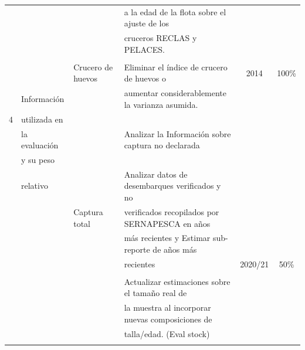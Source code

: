 \documentclass[
  spanish,
]{article}
\begin{document}
\begin{table}[h]
{\begin{tabular}{|c|l|l|l|c|c|}
     &               &                      & a la edad de la flota sobre el ajuste de los     &             & \\
     &               &                      & cruceros RECLAS y PELACES.                       &             & \\ 
     &               &                      &                                                  &             & \\
     &               & Crucero de huevos    & Eliminar el índice de crucero de huevos o        & 2014        & 100\%\\ 
     & Información   &                      & aumentar considerablemente la varianza asumida.  &             & \\ 
  4  & utilizada en  &                      &                                                  &             & \\
     & la evaluación &                      & Analizar la Información sobre captura no declarada&            & \\
     & y su peso     &                      &                                                   &            & \\
     & relativo      &                      & Analizar datos de desembarques verificados y no   &            & \\ 
     &               & Captura total        & verificados recopilados por SERNAPESCA en años    &            & \\ 
     &               &                      & más recientes y  Estimar sub-reporte de años más  &            & \\ 
     &               &                      & recientes                                         & 2020/21    & 50\%\\ 
     &               &                      &                                                   &            & \\
     &               &                      & Actualizar estimaciones sobre el tamaño real de   &            & \\ 
     &               &                      & la muestra al incorporar nuevas composiciones de  &            & \\ 
     &               &                      & talla/edad. (Eval stock)                          &            & \\
     &               &                      &                                                   &            & \\

\end{tabular}}
\end{table}
\end{document}
